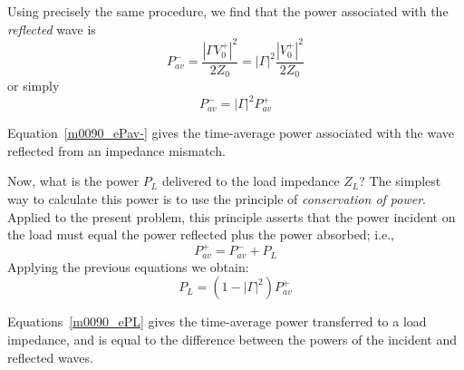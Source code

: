 Using precisely the same procedure, we find that the power associated with the \emph{reflected} wave is
%
\begin{equation}
P_{av}^- = \frac{\left|\Gamma V_0^+\right|^2}{2Z_0} = \left|\Gamma\right|^2 \frac{\left|V_0^+\right|^2}{2Z_0}
\end{equation}
%
or simply
%
\begin{equation}
\boxed{
P_{av}^- = \left|\Gamma\right|^2 P_{av}^+
}
\label{m0090_ePav-}
\end{equation}

\begin{mdframed}[backgroundcolor=yellow!20,nobreak=true] 
Equation~\ref{m0090_ePav-} gives the time-average power associated with the wave reflected from an impedance mismatch.
\end{mdframed}

Now, what is the power $P_L$ delivered to the load impedance $Z_L$?
The simplest way to calculate this power is to use the principle of \emph{conservation of power}.
Applied to the present problem, this principle asserts that the power incident on the load must equal the power reflected plus the power absorbed; i.e.,
%
\begin{equation}
P_{av}^+ = P_{av}^- + P_L
\end{equation}
%
Applying the previous equations we obtain:
%
\begin{equation}
\boxed{
P_L = \left(1-\left|\Gamma\right|^2\right) P_{av}^+
}
\label{m0090_ePL}
\end{equation}

\begin{mdframed}[backgroundcolor=yellow!20,nobreak=true] 
Equations~\ref{m0090_ePL} gives the time-average power transferred to a load impedance, and is equal to the difference between the powers of the incident and reflected waves. 
\end{mdframed}

